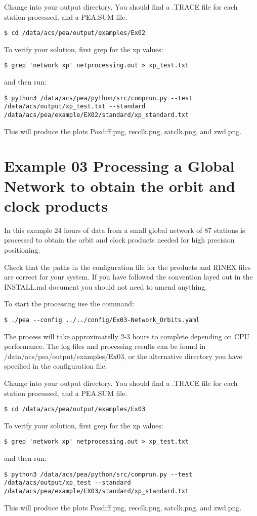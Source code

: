 Change into your output directory. You should find a .TRACE file for each station processed, and a PEA.SUM file.
\begin{verbatim}
$ cd /data/acs/pea/output/examples/Ex02
\end{verbatim}
To verify your solution, first grep for the xp values:
\begin{verbatim}
$ grep 'network xp' netprocessing.out > xp_test.txt
\end{verbatim}
and then run:
\begin{verbatim}
$ python3 /data/acs/pea/python/src/comprun.py --test /data/acs/output/xp_test.txt --standard /data/acs/pea/example/EX02/standard/xp_standard.txt
\end{verbatim}
This will produce the plots Posdiff.png, recclk.png, satclk.png, and zwd.png.

\section{Example 03 Processing a Global Network to obtain the orbit and clock products}
In this example 24 hours of data from a small global network of 87 stations is processed to obtain the orbit and clock products needed for high precision positioning.

Check that the paths in the configuration file for the products and RINEX files are correct for your system. If you have followed the convention layed out in the INSTALL.md document you should not need to amend anything.

To start the processing use the command:
\begin{verbatim}
$ ./pea --config ../../config/Ex03-Network_Orbits.yaml
\end{verbatim}
The process will take approximatelly 2-3 hours to complete depending on CPU performance. The log files and processing results can be found in /data/acs/pea/output/examples/Ex03, or the alternative directory you have specified in the configuration file.

Change into your output directory. You should find a .TRACE file for each station processed, and a PEA.SUM file.
\begin{verbatim}
$ cd /data/acs/pea/output/examples/Ex03
\end{verbatim}
To verify your solution, first grep for the xp values:
\begin{verbatim}
$ grep 'network xp' netprocessing.out > xp_test.txt
\end{verbatim}
and then run:
\begin{verbatim}
$ python3 /data/acs/pea/python/src/comprun.py --test /data/acs/output/xp_test --standard /data/acs/pea/example/EX03/standard/xp_standard.txt
\end{verbatim}
This will produce the plots Posdiff.png, recclk.png, satclk.png, and zwd.png.


